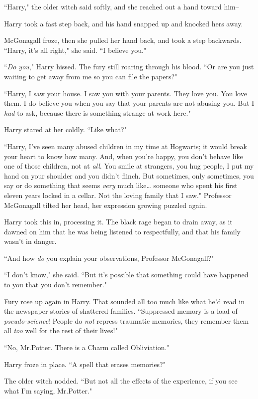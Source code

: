 ``Harry," the older witch said softly, and she reached out a hand toward him\---

Harry took a fast step back, and his hand snapped up and knocked hers away.

McGonagall froze, then she pulled her hand back, and took a step backwards. ``Harry, it's all right," she said. ``I believe you."

``\emph{Do you}," Harry hissed. The fury still roaring through his blood. ``Or are you just waiting to get away from me so you can file the papers?"

``Harry, I saw your house. I saw you with your parents. They love you. You love them. I do believe you when you say that your parents are not abusing you. But I \emph{had} to ask, because there is something strange at work here."

Harry stared at her coldly. ``Like what?"

``Harry, I've seen many abused children in my time at Hogwarts; it would break your heart to know how many. And, when you're happy, you don't behave like one of those children, not at \emph{all}. You smile at strangers, you hug people, I put my hand on your shoulder and you didn't flinch. But sometimes, only sometimes, you say or do something that seems \emph{very} much like{\ldots} someone who spent his first eleven years locked in a cellar. Not the loving family that I saw." Professor McGonagall tilted her head, her expression growing puzzled again.

Harry took this in, processing it. The black rage began to drain away, as it dawned on him that he was being listened to respectfully, and that his family wasn't in danger.

``And how \emph{do} you explain your observations, Professor McGonagall?"

``I don't know," she said. ``But it's possible that something could have happened to you that you don't remember."

Fury rose up again in Harry. That sounded all too much like what he'd read in the newspaper stories of shattered families. ``Suppressed memory is a load of \emph{pseudo-science}! People do \emph{not} repress traumatic memories, they remember them all \emph{too} well for the rest of their lives!"

``No, Mr.\?Potter. There is a Charm called Obliviation."

Harry froze in place. ``A spell that erases memories?"

The older witch nodded. ``But not all the effects of the experience, if you see what I'm saying, Mr.\?Potter."

